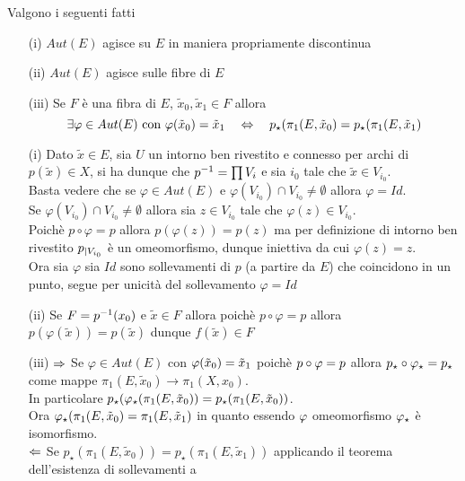 \begin{thm} Valgono i seguenti fatti 
\begin{itemize}
\item[(i)]$Aut(E)$ agisce su $E$ in maniera propriamente discontinua
\item[(ii)] $Aut(E)$ agisce sulle fibre di $E$
\item[(iii)] Se $F$ \`e una fibra  di $E$, $\tilde{x}_0, \tilde{x}_1\in F$ allora 
$$ \exists\varphi\in Aut(E) \text{ con } \varphi(\tilde{x}_0)= \tilde{x}_1 \quad \Leftrightarrow \quad p_\star ( \pi_1(E, \tilde{x}_0)=p_\star ( \pi_1(E,\tilde{x}_1)$$
\end{itemize}
\proof \bbianco 
\begin{itemize}
\item[(i)]Dato $\tilde{x}\in E$, sia $U$ un intorno ben rivestito e connesso per archi di $p(\tilde{x})\in X$, si ha dunque che 
$p^{-1} = \prod V_i$ e sia $i_0$ tale che $\tilde{x}\in V_{i_0}$.\\
Basta vedere che se $\varphi\in Aut(E)$ e $\varphi(V_{i_0})\cap V_{i_0}\neq \emptyset$ allora $\varphi=Id$.\\
Se $\varphi(V_{i_0})\cap V_{i_0} \neq \emptyset$ allora sia $z\in V_{i_0}$ tale che $\varphi(z)\in V_{i_0}$.\\
Poich\`e $p\circ \varphi=p$ allora $p(\varphi(z))=p(z)$ ma per definizione di intorno ben rivestito $p_{\vert V_{i_0}}$ \`e un omeomorfismo, dunque iniettiva da cui $\varphi(z)=z$.\\
Ora sia $\varphi$ sia $Id$ sono sollevamenti di $p$ (a partire da $E$) che coincidono in un punto, segue per unicit\`a del sollevamento $\varphi=Id$
\item[(ii)] Se $F=p^{-1} (x_0)$ e $\tilde{x}\in F$ allora poich\`e $p \circ \varphi = p $ allora $p(\varphi(\tilde{x}))= p(\tilde{x})$ dunque $f(\tilde{x})\in F$
\item[(iii)]$\Rightarrow$ Se $\varphi\in Aut(E)$ con $\varphi(\tilde{x}_0)=\tilde{x}_1$ poich\`e $p\circ \varphi = p $ allora $p_\star \circ \varphi_\star = p_\star$ come mappe $\pi_1(E,\tilde{x}_0)\to \pi_1(X, x_0)$.\\
In particolare $p_\star(\varphi_\star(\pi_1(E, \tilde{x}_0)) =p_\star ( \pi_1(E,\tilde{x}_0))$.\\
Ora $\varphi_\star (\pi_1(E, \tilde{x}_0)=\pi_1(E, \tilde{x}_1)$ in quanto essendo $\varphi$ omeomorfismo  $\varphi_\star $ \`e isomorfismo.\\
$\Leftarrow$ Se $p_\star(\pi_1(E,\tilde{x}_0))= p_\star(\pi_1(E, \tilde{x}_1))$ applicando il teorema dell'esistenza di sollevamenti a 

\end{itemize}
\end{thm}
